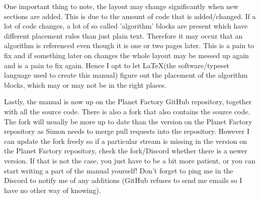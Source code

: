 \documentclass{article}
\begin{document}
One important thing to note, the layout may change significantly when new sections are added. This is due to the amount of code that is added/changed. If a lot of code changes, a lot of so called
'algorithm' blocks are present which have different placement rules than just plain text. Therefore it may occur that an algorithm is referenced even though it is one or two pages later. This is 
a pain to fix and if something later on changes the whole layout may be messed up again and is a pain to fix again. Hence I opt to let \LaTeX (the software/typeset language used to create this 
manual) figure out the placement of the algorithm blocks, which may or may not be in the right places.

Lastly, the manual is now up on the Planet Factory GitHub repository\cite{claudeGit}, together with all the source code. There is also a fork \cite{nomGit} that also contains the source code. 
The fork will usually be more up to date than the version on the Planet Factory repository as Simon needs to merge pull requests into the repository. However I can update the fork freely so if a 
particular stream is missing in the version on the Planet Factory repository, check the fork/Discord whether there is a newer version. If that is not the case, you just have to be a bit more 
patient, or you can start writing a part of the manual yourself! Don't forget to ping me in the Discord to notify me of any additions (GitHub refuses to send me emails so I have no other way of 
knowing).



















\newpage


\newpage


\end{document}
